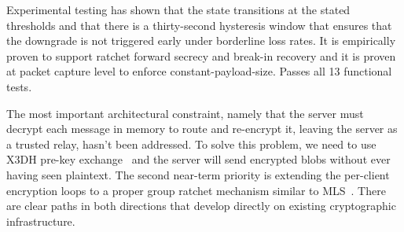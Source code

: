 \documentclass[conference]{IEEEtran}
\begin{document}
Experimental testing has shown that the state transitions at the stated thresholds and that there is a thirty-second hysteresis window that ensures that the downgrade is not triggered early under borderline loss rates. It is empirically proven to support ratchet forward secrecy and break-in recovery and it is proven at packet capture level to enforce constant-payload-size. Passes all 13 functional tests.

The most important architectural constraint, namely that the server must decrypt each message in memory to route and re-encrypt it, leaving the server as a trusted relay, hasn't been addressed. To solve this problem, we need to use X3DH pre-key exchange~\cite{b6} and the server will send encrypted blobs without ever having seen plaintext. The second near-term priority is extending the per-client encryption loops to a proper group ratchet mechanism similar to MLS~\cite{b5}. There are clear paths in both directions that develop directly on existing cryptographic infrastructure.
\end{document}
